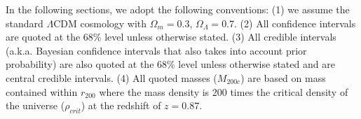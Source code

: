 


In the following sections, we adopt the following conventions: (1) we
assume the standard $\Lambda$CDM cosmology with $\Omega_{m} = 0.3$, $\Omega_{\Lambda} = 0.7$. (2) All confidence intervals are quoted at the 68\% level unless otherwise stated. 
(3) All credible intervals (a.k.a. Bayesian confidence intervals that also
takes into account prior probability) are also
quoted at the 68\% level unless otherwise stated and are central credible
intervals. (4) All quoted masses ($M_{200c}$) are based on mass contained
within $r_{200}$ where the mass density is 200 times the critical density
of the universe ($\rho_{crit}$) at the redshift of $z = 0.87$. 

